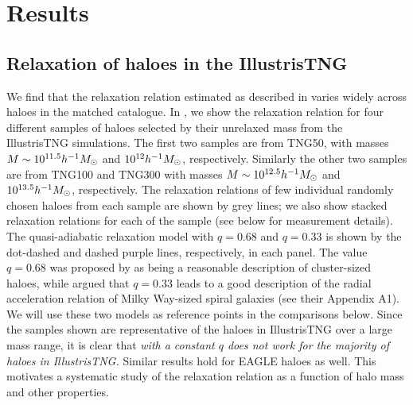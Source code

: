 \section{Results}
\label{sec:results-ch:z0main}


\subsection{Relaxation of haloes in the IllustrisTNG}
\label{sec:results-1-ch:z0main}

We find that the relaxation relation estimated as described in  varies widely across haloes in the matched catalogue. In , we show the relaxation relation for four different samples of haloes selected by their unrelaxed mass from the IllustrisTNG simulations. %
The first two samples are from TNG50, with masses $M \sim 10^{11.5} h^{-1}M_{\odot}$ and $10^{12} h^{-1}M_{\odot}$, respectively. Similarly the other two samples are from TNG100 and TNG300 with masses $M \sim 10^{12.5} h^{-1}M_{\odot}$ and $10^{13.5} h^{-1}M_{\odot}$, respectively. 
The relaxation relations of few individual randomly chosen haloes from each sample are shown by grey lines; we also show stacked relaxation relations for each of the sample (see below for measurement details). The quasi-adiabatic relaxation model  with $q=0.68$ and $q=0.33$ is shown by the dot-dashed and dashed purple lines, respectively, in each panel. The value $q=0.68$ was proposed by \citet{2015JCAP...12..049S} as being a reasonable description of cluster-sized haloes, while \citet{2021MNRAS.507..632P} argued that $q=0.33$ leads to a good description of the radial acceleration relation of Milky Way-sized spiral galaxies (see their Appendix A1). We will use these two models as reference points in the comparisons below.
Since the samples shown are representative of the haloes in IllustrisTNG over a large mass range, it is clear that \emph{ with a constant $q$ does not work for the majority of haloes in IllustrisTNG.} Similar results hold for EAGLE haloes as well. This motivates a systematic study of the relaxation relation as a function of halo mass and other properties.

